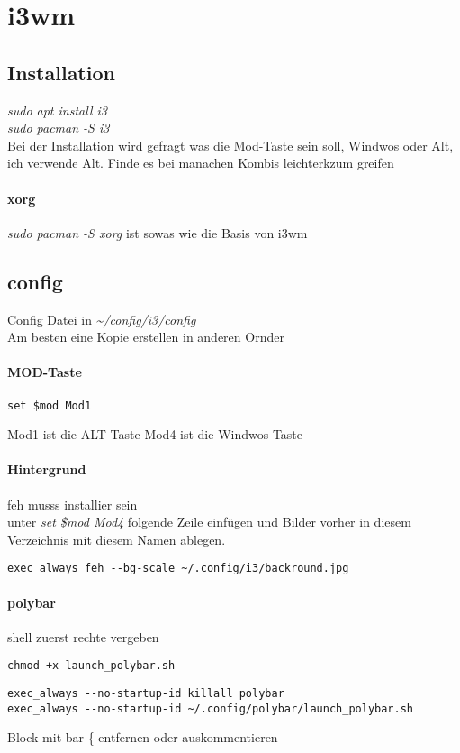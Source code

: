 \documentclass[10pt,a4paper,twoside]{book}
\begin{document}
\section{i3wm}
\subsection{Installation}
\textit{sudo apt install i3}\\
\textit{sudo pacman -S i3}\\
Bei der Installation wird gefragt was die Mod-Taste sein soll, Windwos oder Alt, ich verwende Alt.
Finde es bei manachen Kombis leichterkzum greifen\\
\paragraph{xorg}
\textit{sudo pacman -S xorg} ist sowas wie die Basis von i3wm\\
\subsection{config}
Config Datei in \textit{\textasciitilde /config/i3/config}\\
Am besten eine Kopie erstellen in anderen Ornder\\
\paragraph{MOD-Taste}
\begin{verbatim}
set $mod Mod1
\end{verbatim}
Mod1 ist die ALT-Taste
Mod4 ist die Windwos-Taste
\paragraph{Hintergrund}
feh musss installier sein\\
unter \textit{set \$mod Mod4} folgende Zeile einfügen und Bilder vorher in diesem Verzeichnis mit diesem Namen ablegen.
\begin{verbatim} 
exec_always feh --bg-scale ~/.config/i3/backround.jpg 
\end{verbatim}
\paragraph{polybar}
shell zuerst rechte vergeben\\
\begin{verbatim}
chmod +x launch_polybar.sh
\end{verbatim}
\begin{verbatim}
exec_always --no-startup-id killall polybar
exec_always --no-startup-id ~/.config/polybar/launch_polybar.sh
\end{verbatim}
Block mit bar \{ entfernen oder auskommentieren\\
\end{document}
